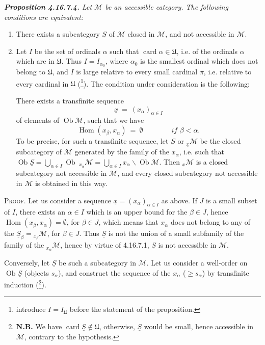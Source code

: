 \documentclass[11pt]{article}
\newcommand{\msp}[1]{\marginpar{\footnotesize [#1]}}
\newcommand{\Ob}{\operatorname{Ob}}
\newcommand{\Hom}{\operatorname{Hom}}
\newcommand{\card}{\operatorname{card}}
\newcommand{\cM}{\mathcal{M}}
\newcommand{\uS}{\underline{S}}
\newcommand{\U}{\mathfrak{U}}
\begin{document}
\begingroup\itshape
\noindent\textbf{\upshape Proposition 4.16.7.4.} Let $\cM$ be an accessible category. The following conditions are equivalent:
\begin{enumerate}[label={}]
\item[a)] There exists a subcategory $\uS$ of $\cM$ closed in $\cM$, and not accessible in $\cM$.
\item[b)] Let $I$ be the set of ordinals $\alpha$ such that $\card \alpha \in \U$, i.e. of the
\msp{page 481}
ordinals $\alpha$ which are in $\U$. Thus $I = I_{\alpha_0}$, where $\alpha_0$ is the smallest ordinal which does not belong to $\U$, and $I$ is large relative to every small cardinal $\pi$, i.e. relative to every cardinal in $\U$ \textup{(}\footnote{introduce $I = I_{\U}$ before the statement of the proposition.}\textup{)}. The condition under consideration is the following:

There exists a transfinite sequence %
\[
\underline{x} \ =\ (x_\alpha)_{\alpha\in I}
\]
of elements of $\Ob \cM$, such that we have
\[
\Hom(x_\beta, x_\alpha) \ =\ \emptyset \qquad\qquad \textit{if } \beta < \alpha.
\]
To be precise, for such a transfinite sequence, let $\uS$ or ${}_{\underline{x}}\cM$ be the closed subcategory of $\cM$ generated by the family of the $x_\alpha$, i.e. such that $\Ob \uS = \bigcup_{\alpha\in I} \Ob\ {}_{x_\alpha}\cM = \bigcup_{\alpha\in I} x_\alpha\backslash\Ob \cM$. Then ${}_{\underline{x}}\cM$ is a closed subcategory not accessible in $\cM$, and every closed subcategory not accessible in $\cM$ is obtained in this way.
\end{enumerate}
\endgroup

\textsc{Proof}. Let us consider a sequence $\underline{x} = (x_\alpha)_{\alpha\in I}$ as above. If $J$ is a small subset of $I$, there exists an $\alpha \in I$ which is an upper bound for the $\beta \in J$, hence $\Hom(x_\beta, x_\alpha) = \emptyset$, for $\beta \in J$,
\msp{page 482}
which means that $x_\alpha$ does not belong to any of the $\uS_\beta = {}_{x_\beta}\cM$, for $\beta \in J$. Thus $\uS$ is not the union of a small subfamily of the family of the ${}_{x_\alpha}\cM$, hence by virtue of 4.16.7.1, $\uS$ is not accessible in $\cM$. %

Conversely, let $\uS$ be such a subcategory in $\cM$. Let us consider a well-order on $\Ob \uS$ (objects $s_\alpha$), and construct the sequence of the $x_\alpha$ ($\geqslant s_\alpha$) by transfinite induction (\footnote{\textbf{N.B.} We have $\card \uS \notin \U$, otherwise, $\uS$ would be small, hence accessible in $\cM$, contrary to the hypothesis.}).
\end{document}
